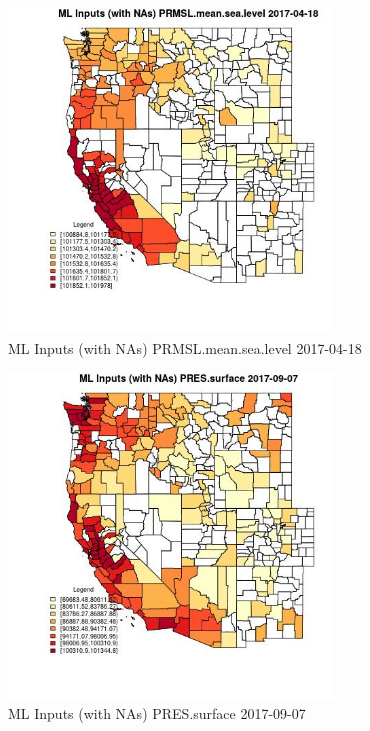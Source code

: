 \begin{figure} 
\centering  
\includegraphics[width=0.77\textwidth]{Code_Outputs/Report_ML_input_PM25_Step4_part_e_de_duplicated_aves_compiled_2019-05-20wNAs_CountyPRMSLmeansealevelMean2017-04-18.jpg} 
\caption{\label{fig:Report_ML_input_PM25_Step4_part_e_de_duplicated_aves_compiled_2019-05-20wNAsCountyPRMSLmeansealevelMean2017-04-18}ML Inputs (with NAs) PRMSL.mean.sea.level 2017-04-18} 
\end{figure} 
 

\begin{figure} 
\centering  
\includegraphics[width=0.77\textwidth]{Code_Outputs/Report_ML_input_PM25_Step4_part_e_de_duplicated_aves_compiled_2019-05-20wNAs_CountyPRESsurfaceMean2017-09-07.jpg} 
\caption{\label{fig:Report_ML_input_PM25_Step4_part_e_de_duplicated_aves_compiled_2019-05-20wNAsCountyPRESsurfaceMean2017-09-07}ML Inputs (with NAs) PRES.surface 2017-09-07} 
\end{figure} 
 

